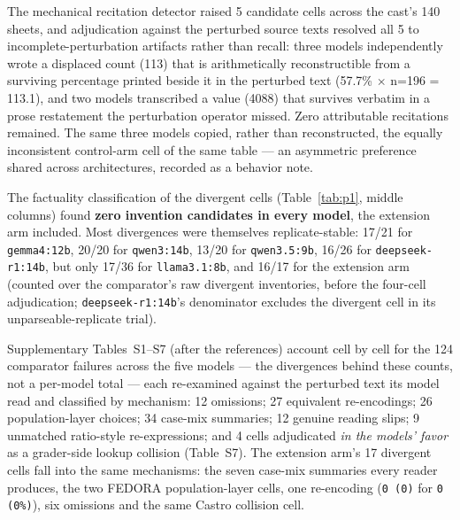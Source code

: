 \documentclass[11pt]{article}
\begin{document}
The mechanical recitation detector raised 5 candidate cells across the cast's 140 sheets, and adjudication against the perturbed source texts resolved all 5 to incomplete-perturbation artifacts rather than recall: three models independently wrote a displaced count (113) that is arithmetically reconstructible from a surviving percentage printed beside it in the perturbed text (57.7\% $\times$ n=196 = 113.1), and two models transcribed a value (4088) that survives verbatim in a prose restatement the perturbation operator missed. Zero attributable recitations remained. The same three models copied, rather than reconstructed, the equally inconsistent control-arm cell of the same table --- an asymmetric preference shared across architectures, recorded as a behavior note.

The factuality classification of the divergent cells (Table~\ref{tab:p1}, middle columns) found \textbf{zero invention candidates in every model}, the extension arm included. Most divergences were themselves replicate-stable: 17/21 for \texttt{gemma4:12b}, 20/20 for \texttt{qwen3:14b}, 13/20 for \texttt{qwen3.5:9b}, 16/26 for \texttt{deepseek-r1:14b}, but only 17/36 for \texttt{llama3.1:8b}, and 16/17 for the extension arm (counted over the comparator's raw divergent inventories, before the four-cell adjudication; \texttt{deepseek-r1:14b}'s denominator excludes the divergent cell in its unparseable-replicate trial).

Supplementary Tables~S1--S7 (after the references) account cell by cell for the 124 comparator failures across the five models --- the divergences behind these counts, not a per-model total --- each re-examined against the perturbed text its model read and classified by mechanism: 12 omissions; 27 equivalent re-encodings; 26 population-layer choices; 34 case-mix summaries; 12 genuine reading slips; 9 unmatched ratio-style re-expressions; and 4 cells adjudicated \emph{in the models' favor} as a grader-side lookup collision (Table~S7). The extension arm's 17 divergent cells fall into the same mechanisms: the seven case-mix summaries every reader produces, the two FEDORA population-layer cells, one re-encoding (\texttt{0 (0)} for \texttt{0 (0\%)}), six omissions and the same Castro collision cell.
\end{document}
